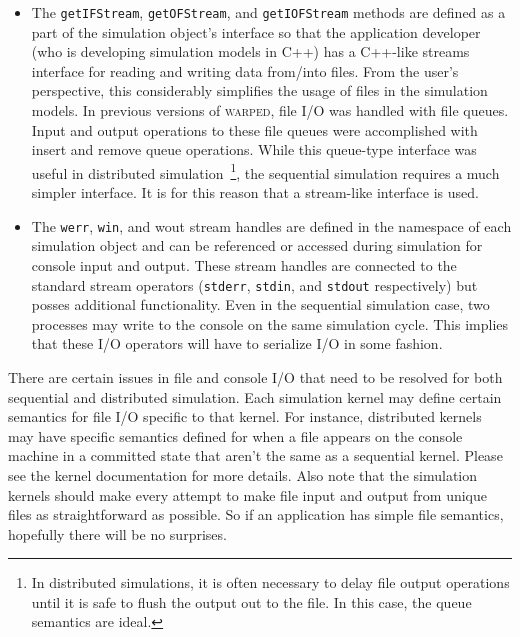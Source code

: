 \documentclass[11pt]{article}
\begin{document}
\begin{itemize}

\item The {\tt getIFStream}, {\tt getOFStream}, and {\tt getIOFStream}
  methods are defined as a part of the simulation object's interface so
  that the application developer (who is developing simulation models in
  C++) has a C++-like streams interface for reading and writing data
  from/into files. From the user's perspective, this considerably
  simplifies the usage of files in the simulation models. In previous
  versions of \textsc{warped}, file I/O was handled with file
  queues. Input and output operations to these file queues were
  accomplished with insert and remove queue operations. While this
  queue-type interface was useful in distributed simulation~\footnote{In
  distributed simulations, it is often necessary to delay file output
  operations until it is safe to flush the output out to the file. In this
  case, the queue semantics are ideal.}, the sequential simulation
  requires a much simpler interface. It is for this reason that a
  stream-like interface is used. 

\item The {\tt werr}, {\tt win}, and {wout} stream handles are defined in
  the namespace of each simulation object and can be referenced or
  accessed during simulation for console input and output. These stream
  handles are connected to the standard stream operators ({\tt stderr},
  {\tt stdin}, and {\tt stdout} respectively) but posses additional
  functionality. Even in the sequential simulation case, two processes
  may write to the console on the same simulation cycle. This implies that 
  these I/O operators will have to serialize I/O in some fashion.

\end{itemize}

There are certain issues in file and console I/O that need to be resolved
for both sequential and distributed simulation. Each simulation kernel may
define certain semantics for file I/O specific to that kernel.  For
instance, distributed kernels may have specific semantics defined for when
a file appears on the console machine in a committed state that aren't the
same as a sequential kernel.  Please see the kernel documentation for more
details. Also note that the simulation kernels should make every attempt
to make file input and output from unique files as straightforward as
possible. So if an application has simple file semantics, hopefully there
will be no surprises.
\end{document}
